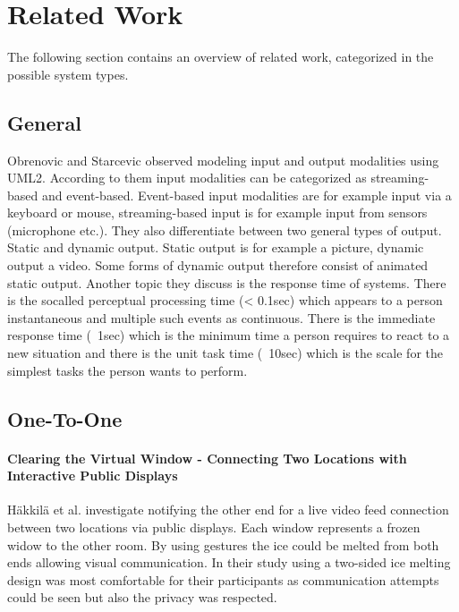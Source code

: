 \section{Related Work}
The following section contains an overview of related work, categorized in the possible system types.

\subsection{General}
Obrenovic and Starcevic \cite{obrenovic_modeling_2004} observed modeling input and output modalities using UML2.
According to them input modalities can be categorized as streaming-based and event-based.
Event-based input modalities are for example input via a keyboard or mouse, streaming-based input is for example input from sensors (microphone etc.).
They also differentiate between two general types of output.
Static and dynamic output.
Static output is for example a picture, dynamic output a video.
Some forms of dynamic output therefore consist of animated static output.
Another topic they discuss is the response time of systems.
There is the socalled perceptual processing time (< 0.1sec) which appears to a person instantaneous and multiple such events as continuous.
There is the immediate response time (~1sec) which is the minimum time a person requires to react to a new situation and there is the unit task time (~10sec) which is the scale for the simplest tasks the person wants to perform.

\subsection{One-To-One}

\paragraph{Clearing the Virtual Window - Connecting Two Locations
with Interactive Public Displays }
Häkkilä et al. \cite{hakkila_clearing_2013} investigate notifying the other end for a live video feed connection between two locations via public displays.
Each window represents a frozen widow to the other room.
By using gestures the ice could be melted from both ends allowing visual communication.
In their study using a two-sided ice melting design was most comfortable for their participants as communication attempts could be seen but also the privacy was respected.

